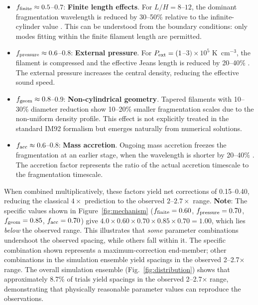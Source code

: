 \documentclass[11pt,a4paper]{article}
\begin{document}
\begin{itemize}
    \item $f_{\rm finite} \approx 0.5$--$0.7$: \textbf{Finite length effects}. For $L/H = 8$--$12$, the dominant fragmentation wavelength is reduced by 30--50\% relative to the infinite-cylinder value \citep{Inutsuka1997}. This can be understood from the boundary conditions: only modes fitting within the finite filament length are permitted.

    \item $f_{\rm pressure} \approx 0.6$--$0.8$: \textbf{External pressure}. For $P_{\rm ext} = (1$--$3) \times 10^5$ K~cm$^{-3}$, the filament is compressed and the effective Jeans length is reduced by 20--40\% \citep{Fischera2012}. The external pressure increases the central density, reducing the effective sound speed.

    \item $f_{\rm geom} \approx 0.8$--$0.9$: \textbf{Non-cylindrical geometry}. Tapered filaments with 10--30\% diameter reduction show 10--20\% smaller fragmentation scales due to the non-uniform density profile. This effect is not explicitly treated in the standard IM92 formalism but emerges naturally from numerical solutions.

    \item $f_{\rm acc} \approx 0.6$--$0.8$: \textbf{Mass accretion}. Ongoing mass accretion freezes the fragmentation at an earlier stage, when the wavelength is shorter by 20--40\% \citep{Heitsch2013}. The accretion factor represents the ratio of the actual accretion timescale to the fragmentation timescale.
\end{itemize}

When combined multiplicatively, these factors yield net corrections of 0.15--0.40, reducing the classical $4\times$ prediction to the observed $2$--$2.7\times$ range. \textbf{Note}: The specific values shown in Figure~\ref{fig:mechanism} ($f_{\rm finite} = 0.60$, $f_{\rm pressure} = 0.70$, $f_{\rm geom} = 0.85$, $f_{\rm acc} = 0.70$) give $4.0 \times 0.60 \times 0.70 \times 0.85 \times 0.70 = 1.00$, which lies \textit{below} the observed range. This illustrates that \textit{some} parameter combinations undershoot the observed spacing, while others fall within it. The specific combination shown represents a maximum-correction end-member; other combinations in the simulation ensemble yield spacings in the observed 2--2.7× range. The overall simulation ensemble (Fig.~\ref{fig:distribution}) shows that approximately 8.7\% of trials yield spacings in the observed 2--2.7× range, demonstrating that physically reasonable parameter values can reproduce the observations.
\end{document}
